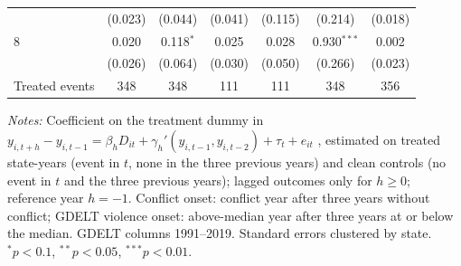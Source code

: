 \begin{table}[htbp]
\begin{threeparttable}
\begin{tabular}{lcccccc}
 & (0.023) & (0.044) & (0.041) & (0.115) & (0.214) & (0.018) \\
8 & 0.020 & 0.118$^{*}$ & 0.025 & 0.028 & 0.930$^{***}$ & 0.002 \\
 & (0.026) & (0.064) & (0.030) & (0.050) & (0.266) & (0.023) \\
\midrule
Treated events & 348 & 348 & 111 & 111 & 348 & 356 \\
\bottomrule
\end{tabular}
\begin{tablenotes}[flushleft]\footnotesize
\item \textit{Notes:} Coefficient on the treatment dummy in $y_{i,t+h}-y_{i,t-1} = \beta_h D_{it} + \gamma_h'(y_{i,t-1}, y_{i,t-2}) + \tau_t + e_{it}$ \citep{dube2023}, estimated on treated state-years (event in $t$, none in the three previous years) and clean controls (no event in $t$ and the three previous years); lagged outcomes only for $h\geq 0$; reference year $h=-1$. Conflict onset: conflict year after three years without conflict; GDELT violence onset: above-median year after three years at or below the median. GDELT columns 1991--2019. Standard errors clustered by state. $^{*}p<0.1$, $^{**}p<0.05$, $^{***}p<0.01$.
\end{tablenotes}
\end{threeparttable}
\end{table}
